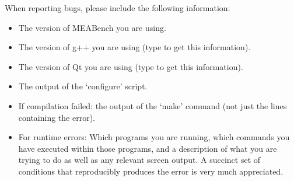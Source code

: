 \documentclass[12pt,oneside]{book}
\def\meabench{{MEABench}\xspace}
\begin{document}
When reporting bugs, please include the following information:
\begin{itemize}
\item The version of \meabench you are using.
\item The version of g++ you are using (type 
to get this information).
\item The version of Qt you are using (type  to get this
information).
\item The output of the `configure' script.
\item If compilation failed: the output of the `make' command (not
just the lines containing the error).
\item For runtime errors: Which programs you are running, which
commands you have executed within those programs, and a description of
what you are trying to do as well as any relevant screen output. A
succinct set of conditions that reproducibly produces the error is
very much appreciated.
\end{itemize}
\end{document}
